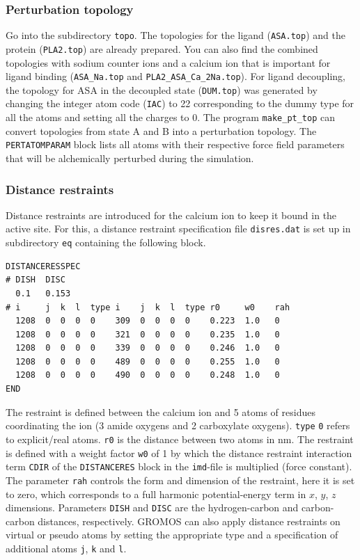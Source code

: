 \subsubsection{Perturbation topology}
Go into the subdirectory \texttt{topo}. The topologies for the ligand (\texttt{ASA.top}) and the protein (\texttt{PLA2.top}) are already prepared. You can also find the combined topologies with sodium counter ions and a calcium ion that is important for ligand binding (\texttt{ASA\_Na.top} and \texttt{PLA2\_ASA\_Ca\_2Na.top}). For ligand decoupling, the topology for ASA in the decoupled state (\texttt{DUM.top}) was generated by changing the integer atom code (\texttt{IAC}) to 22 corresponding to the dummy type for all the atoms and setting all the charges to 0. The program \texttt{make\_pt\_top} can convert topologies from state A and B into a perturbation topology. The \texttt{PERTATOMPARAM} block lists all atoms with their respective force field parameters that will be alchemically perturbed during the simulation. 

\subsubsection{Distance restraints}
Distance restraints are introduced for the calcium ion to keep it bound in the active site. For this, a distance restraint specification file \texttt{disres.dat} is set up in subdirectory \texttt{eq} containing the following block.
\begin{lstlisting}[columns=flexible]
DISTANCERESSPEC
# DISH  DISC
  0.1   0.153
# i     j  k  l  type i    j  k  l  type r0     w0    rah
  1208  0  0  0  0    309  0  0  0  0    0.223  1.0   0
  1208  0  0  0  0    321  0  0  0  0    0.235  1.0   0
  1208  0  0  0  0    339  0  0  0  0    0.246  1.0   0
  1208  0  0  0  0    489  0  0  0  0    0.255  1.0   0
  1208  0  0  0  0    490  0  0  0  0    0.248  1.0   0
END
\end{lstlisting}
The restraint is defined between the calcium ion and 5 atoms of residues coordinating the ion (3 amide oxygens and 2 carboxylate oxygens). \texttt{type} \texttt{0} refers to explicit/real atoms. \texttt{r0} is the distance between two atoms in nm. The restraint is defined with a weight factor \texttt{w0} of 1 by which the distance restraint interaction term \texttt{CDIR} of the \texttt{DISTANCERES} block in the \texttt{imd}-file is multiplied (force constant). The parameter \texttt{rah} controls the form and dimension of the restraint, here it is set to zero, which corresponds to a full harmonic potential-energy term in $x$, $y$, $z$ dimensions. Parameters \texttt{DISH} and \texttt{DISC} are the hydrogen-carbon and carbon-carbon distances, respectively. GROMOS can also apply distance restraints on virtual or pseudo atoms by setting the appropriate type and a specification of additional atoms \texttt{j}, \texttt{k} and \texttt{l}. \\

